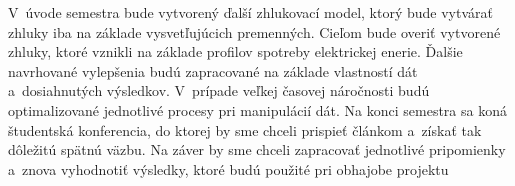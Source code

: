 \documentclass[a4paper,twoside,slovak,12pt,appendix]{article}
\begin{document}
\begin{appendices}
\noindent
V~úvode semestra bude vytvorený ďalší zhlukovací model, ktorý bude vytvárať
zhluky iba na základe vysvetľujúcich premenných. Cieľom bude overiť vytvorené
zhluky, ktoré vznikli na základe profilov spotreby elektrickej enerie. Ďalšie
navrhované vylepšenia budú zapracované na základe vlastností dát a~dosiahnutých
výsledkov. V~prípade veľkej časovej náročnosti budú optimalizované jednotlivé
procesy pri manipulácií dát. Na konci semestra sa koná študentská konferencia,
do ktorej by sme chceli prispieť článkom a~získať tak dôležitú spätnú väzbu.
Na záver by sme chceli zapracovať jednotlivé pripomienky a~znova vyhodnotiť
výsledky, ktoré budú použité pri obhajobe projektu


\end{appendices}
\end{document}
